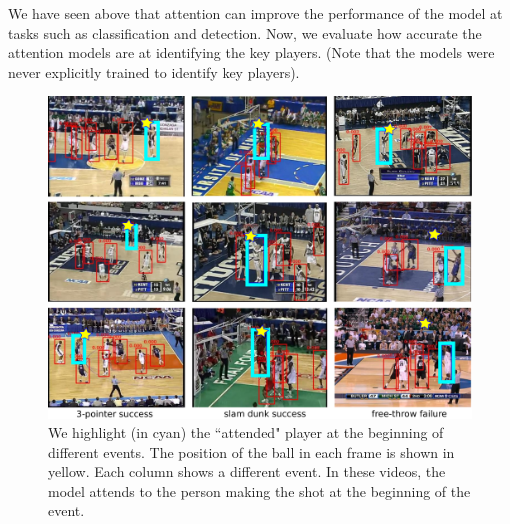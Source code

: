 We have seen above that attention can improve the performance of the
model at tasks such as classification and detection. 
Now, we evaluate how accurate the attention models are at
identifying the key players. (Note that the models were never
explicitly trained to identify key players).



\begin{figure}[t!]
\begin{center}
   \includegraphics[width=0.90\linewidth]{images/visual_examples_v2.pdf}
\end{center}
   \caption{We highlight (in cyan) the ``attended" player at the beginning of different events.
     The position of the ball in each frame is shown in yellow.
   Each column shows a different event. In these videos, the model attends
 to the person making the shot at the beginning of the event.}
\label{fig:visual_attention}
\end{figure}


